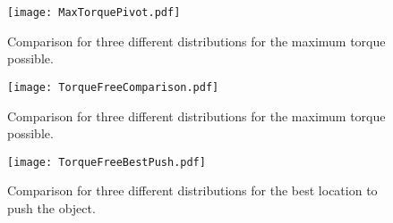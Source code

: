 \begin{figure}
\begin{center}
	\texttt{[image: MaxTorquePivot.pdf]}
\end{center}
\caption{\label{fig:maxTorPiv}
Comparison for three different distributions for the maximum torque possible.
}
\vspace{0em}
\end{figure}


\begin{figure}
\begin{center}
	\texttt{[image: TorqueFreeComparison.pdf]}
\end{center}
\vspace{-1em}
\caption{\label{fig:maxTorqueFree}
Comparison for three different distributions for the maximum torque possible.
}
\vspace{0em}
\end{figure}


\begin{figure}
\begin{center}
	\texttt{[image: TorqueFreeBestPush.pdf]}
\end{center}
\caption{\label{fig:bestLocFree}
Comparison for three different distributions for the best location to push the object.
}
\vspace{0em}
\end{figure}



